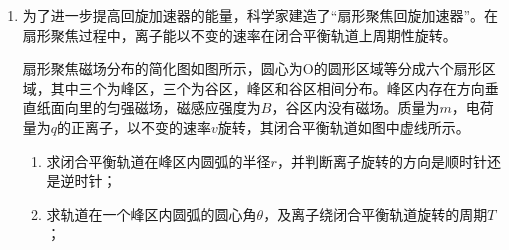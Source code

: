 \documentclass[\gkver]{gaokaozhenti}
\begin{document}
\begin{enumerate}
{\begin{enumerate}
	\item
	$48\UN$

	\item
	$64\UJ$，$26.88\UJ$

\end{enumerate}
}

\item
为了进一步提高回旋加速器的能量，科学家建造了“扇形聚焦回旋加速器”。在扇形聚焦过程中，离子能以不变的速率在闭合平衡轨道上周期性旋转。

扇形聚焦磁场分布的简化图如图所示，圆心为O的圆形区域等分成六个扇形区域，其中三个为峰区，三个为谷区，峰区和谷区相间分布。峰区内存在方向垂直纸面向里的匀强磁场，磁感应强度为$B$，谷区内没有磁场。质量为$m$，电荷量为$q$的正离子，以不变的速率$v$旋转，其闭合平衡轨道如图中虚线所示。
\begin{enumerate}
	\item
	求闭合平衡轨道在峰区内圆弧的半径$r$，并判断离子旋转的方向是顺时针还是逆时针；

	\item
	求轨道在一个峰区内圆弧的圆心角$\theta$，及离子绕闭合平衡轨道旋转的周期$T$；


\end{enumerate}
\end{enumerate}
\end{document}
